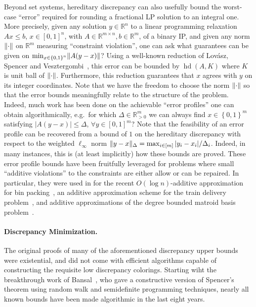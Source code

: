 \documentclass[11pt]{article}
\newcommand{\R}{{\mathbb{R}}}
\newcommand{\set}[1]{\left\{ #1 \right\}}
\DeclareMathOperator{\hd}{hd}
\DeclarePairedDelimiter\norm{\lVert}{\rVert}
\begin{document}
Beyond set systems, hereditary discrepancy can also usefully bound the
worst-case ``error'' required for rounding a fractional LP solution to an
integral one. More precisely, given any solution $y \in \R^n$ to a linear
programming relaxation $Ax \leq b$, $x \in [0,1]^n$, with $A \in \R^{m \times
n}, b \in \R^m$, of a binary IP, and given any norm $\norm{\cdot}$ on $\R^m$
measuring ``constraint violation'', one can ask what guarantees can be given on
$\min_{x \in \set{0,1}^n} \norm{A(y-x)}$? Using a well-known reduction of
Lov{\'a}sz, Spencer and Vesztergombi~\cite{LSV}, this error can be bounded by
$\hd(A,K)$ where $K$ is unit ball of $\norm{\cdot}$. Furthermore,
this reduction guarantees that $x$ agrees with $y$ on its integer coordinates.
Note that we have the freedom to choose the norm $\norm{\cdot}$ so that the
error bounds meaningfully relate to the structure of the problem. Indeed, much
work has been done on the achievable ``error profiles'' one can obtain
algorithmically, e.g.~for which $\Delta \in \R^m_{> 0}$ we can always find $x
\in \set{0,1}^m$ satisfying $|A(y-x)| \leq \Delta$, $\forall y \in [0,1]^m$?
Note that the feasibility of an error profile can be recovered from a bound of
$1$ on the hereditary discrepancy with respect to the weighted $\ell_\infty$
norm $\norm{y-x}_{\Delta} = \max_{i \in [m]} |y_i-x_i|/\Delta_i$.  Indeed, in
many instances, this is (at least implicitly) how these bounds are proved. These
error profile bounds have been fruitfully leveraged for problems where small
``additive violations'' to the constraints are either allow or can be repaired.
In particular, they were used in for the recent $O(\log n)$-additive
approximation for bin packing~\cite{HobergRothvoss17}, an additive approximation
scheme for the train delivery problem~\cite{R12}, and additive approximations of
the degree bounded matroid basis problem~\cite{BN15}. 

\paragraph{\bf Discrepancy Minimization.} The original proofs of many of the
aforementioned discrepancy upper bounds were existential, and did not come with
efficient algorithms capable of constructing the requisite low discrepancy
colorings. %
Starting wiht the breakthrough work of Bansal~\cite{Bansal10}, who gave a constructive version of Spencer's theorem using random walk and semidefinite programming techniques, nearly all known bounds have been made algorithmic in the last eight years.
\end{document}

